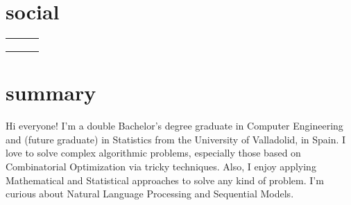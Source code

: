 \documentclass{friggeri-cv}
\newcommand{\myhref}[2]{\href[pdfnewwindow=true]{#1}{#2}}
\begin{document}


  \section{social}

    \begin{center}
      \renewcommand{\arraystretch}{2}
      \begin{tabular}{ p{16em} p{17em} p{16em} }
        \myhref{https://garciparedes.me}{\faHome\quad Website: garciparedes.me}
        &
        \myhref{mailto:sergio@garciparedes.me}{\faEnvelope\quad Email: sergio@garciparedes.me}
        &
        \myhref{https://es.linkedin.com/in/garciparedes/en}{\faLinkedin\quad LinkedIn: Sergio García Prado}
        \\

        \myhref{https://github.com/garciparedes}{\faGithub\quad GitHub: @garciparedes}
        &
        \myhref{https://scholar.google.es/citations?user=X3Mb7BAAAAAJ}{\faGraduationCap\quad Scholar: Sergio García Prado}
        &
        \myhref{https://stackoverflow.com/users/3921457/garciparedes}{\faStackOverflow\quad StackOverflow: @garciparedes}
        \\ \\

      \end{tabular}
    \end{center}




  \section{summary}

    Hi everyone! I'm a double Bachelor's degree graduate in Computer Engineering and (future graduate) in Statistics from the University of Valladolid, in Spain. I love to solve complex algorithmic problems, especially those based on Combinatorial Optimization via tricky techniques. Also, I enjoy applying Mathematical and Statistical approaches to solve any kind of problem. I'm curious about Natural Language Processing and Sequential Models.
\end{document}
